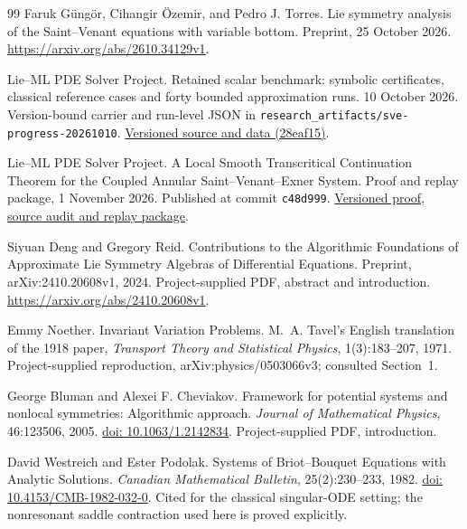 \documentclass[12pt,a4paper,oneside]{report}
\numberwithin{equation}{chapter}
\theoremstyle{remark}\newtheorem{remark}[theorem]{Remark}
\DeclareRobustCommand{\code}[1]{\nolinkurl{#1}}
\newcommand{\doi}[1]{\href{https://doi.org/#1}{doi: #1}}
\begin{document}
\begin{thebibliography}{99}
Faruk G\"ung\"or, Cihangir \"Ozemir, and Pedro J. Torres. Lie symmetry analysis of the Saint--Venant equations with variable bottom. Preprint, 25 October 2026. \url{https://arxiv.org/abs/2610.34129v1}.

Lie--ML PDE Solver Project. Retained scalar benchmark: symbolic certificates,
classical reference cases and forty bounded approximation runs. 10 October 2026.
Version-bound carrier and run-level JSON in \code{research_artifacts/sve-progress-20261010}.
\href{https://github.com/CarlXerophilem/Lie-ML_PDES/tree/28eaf15237d58654a841be84f3e066f340b5f17d/research_artifacts/sve-progress-20261010}{Versioned source and data (28eaf15)}.

Lie--ML PDE Solver Project. A Local Smooth Transcritical Continuation Theorem
for the Coupled Annular Saint--Venant--Exner System. Proof and replay package,
1 November 2026. Published at commit \code{c48d999}.
\href{https://github.com/CarlXerophilem/Lie-ML_PDES/tree/c48d9994e4bfaf69a91913c73a59e7ef8f1e1bf7/research_artifacts/annular-transcritical-theorem-20261101}{Versioned proof, source audit and replay package}.

Siyuan Deng and Gregory Reid. Contributions to the Algorithmic Foundations of
Approximate Lie Symmetry Algebras of Differential Equations. Preprint,
arXiv:2410.20608v1, 2024. Project-supplied PDF, abstract and introduction.
\url{https://arxiv.org/abs/2410.20608v1}.

Emmy Noether. Invariant Variation Problems. M.~A. Tavel's English translation
of the 1918 paper, \emph{Transport Theory and Statistical Physics},
1(3):183--207, 1971. Project-supplied reproduction,
arXiv:physics/0503066v3; consulted Section~1.

George Bluman and Alexei F. Cheviakov. Framework for potential systems and
nonlocal symmetries: Algorithmic approach. \emph{Journal of Mathematical
Physics}, 46:123506, 2005. \doi{10.1063/1.2142834}.
Project-supplied PDF, introduction.

David Westreich and Ester Podolak. Systems of Briot--Bouquet Equations with
Analytic Solutions. \emph{Canadian Mathematical Bulletin}, 25(2):230--233,
1982. \doi{10.4153/CMB-1982-032-0}. Cited for the classical singular-ODE
setting; the nonresonant saddle contraction used here is proved explicitly.

\end{thebibliography}
\endgroup
\end{document}
